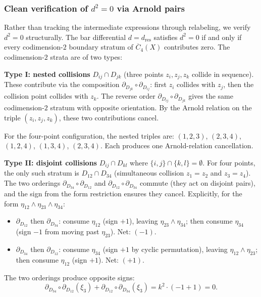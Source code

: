 \subsubsection*{Clean verification of $d^2 = 0$ via Arnold pairs}

Rather than tracking the intermediate expressions through
relabeling, we verify $d^2 = 0$ structurally.  The bar differential
$d = d_{\mathrm{res}}$ satisfies $d^2 = 0$ if and only if
every codimension-$2$ boundary stratum of $\overline{C}_4(X)$
contributes zero.  The codimension-$2$ strata are of two types:

\medskip
\noindent\textbf{Type I: nested collisions} $D_{ij} \cap D_{jk}$
(three points $z_i, z_j, z_k$ collide in sequence).
These contribute via the composition
$\partial_{D_{jk}} \circ \partial_{D_{ij}}$:
first $z_i$ collides with $z_j$, then the collision point
collides with $z_k$.  The reverse order
$\partial_{D_{ij}} \circ \partial_{D_{jk}}$ gives the same
codimension-$2$ stratum with opposite orientation.  By the
Arnold relation on the triple $(z_i, z_j, z_k)$, these two
contributions cancel.

For the four-point configuration, the nested triples are:
$(1,2,3)$, $(2,3,4)$, $(1,2,4)$, $(1,3,4)$, $(2,3,4)$.
Each produces one Arnold-relation cancellation.

\medskip
\noindent\textbf{Type II: disjoint collisions} $D_{ij} \cap D_{kl}$
where $\{i,j\} \cap \{k,l\} = \emptyset$.
For four points, the only such stratum is $D_{12} \cap D_{34}$
(simultaneous collision $z_1 = z_2$ and $z_3 = z_4$).  The two
orderings $\partial_{D_{34}} \circ \partial_{D_{12}}$ and
$\partial_{D_{12}} \circ \partial_{D_{34}}$ commute (they act
on disjoint pairs), and the sign from the form restriction
ensures they cancel.  Explicitly, for the form
$\eta_{12} \wedge \eta_{23} \wedge \eta_{34}$:
\begin{itemize}
\item $\partial_{D_{12}}$ then $\partial_{D_{34}}$:
  consume $\eta_{12}$ (sign $+1$), leaving
  $\eta_{23} \wedge \eta_{34}$; then consume $\eta_{34}$
  (sign $-1$ from moving past $\eta_{23}$).  Net: $(-1)$.
\item $\partial_{D_{34}}$ then $\partial_{D_{12}}$:
  consume $\eta_{34}$ (sign $+1$ by cyclic permutation),
  leaving $\eta_{12} \wedge \eta_{23}$; then consume
  $\eta_{12}$ (sign $+1$).  Net: $(+1)$.
\end{itemize}
The two orderings produce opposite signs:
\begin{equation}\label{eq:frame-disjoint-cancel}
\partial_{D_{34}} \circ \partial_{D_{12}}(\xi_3)
+ \partial_{D_{12}} \circ \partial_{D_{34}}(\xi_3)
= k^2 \cdot (-1 + 1) = 0.
\end{equation}

